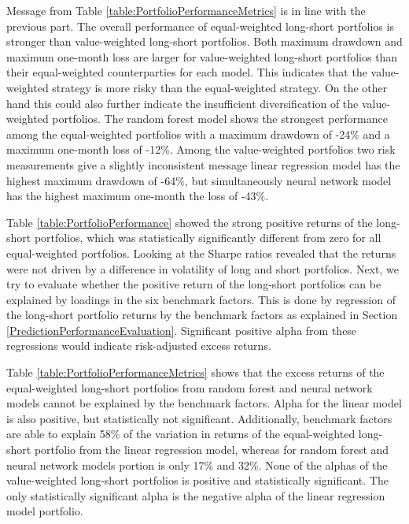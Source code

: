 \documentclass[12pt]{article}
\begin{document}
Message from Table \ref{table:PortfolioPerformanceMetrics} is in line with the previous part. The overall performance of equal-weighted long-short portfolios is stronger than value-weighted long-short portfolios. Both maximum drawdown and maximum one-month loss are larger for value-weighted long-short portfolios than their equal-weighted counterparties for each model. This indicates that the value-weighted strategy is more risky than the equal-weighted strategy. On the other hand this could also further indicate the insufficient diversification of the value-weighted portfolios. The random forest model shows the strongest performance among the equal-weighted portfolios with a maximum drawdown of -24\% and a maximum one-month loss of -12\%. Among the value-weighted portfolios two risk measurements give a slightly inconsistent message linear regression model has the highest maximum drawdown of -64\%, but simultaneously neural network model has the highest maximum one-month the loss of -43\%. \par

Table \ref{table:PortfolioPerformance} showed the strong positive returns of the long-short portfolios, which was statistically significantly different from zero for all equal-weighted portfolios. Looking at the Sharpe ratios revealed that the returns were not driven by a difference in volatility of long and short portfolios. Next, we try to evaluate whether the positive return of the long-short portfolios can be explained by loadings in the six benchmark factors. This is done by regression of the long-short portfolio returns by the benchmark factors as explained in Section \ref{PredictionPerformanceEvaluation}. Significant positive alpha from these regressions would indicate risk-adjusted excess returns. \par

Table \ref{table:PortfolioPerformanceMetrics} shows that the excess returns of the equal-weighted long-short portfolios from random forest and neural network models cannot be explained by the benchmark factors. Alpha for the linear model is also positive, but statistically not significant. Additionally, benchmark factors are able to explain 58\% of the variation in returns of the equal-weighted long-short portfolio from the linear regression model, whereas for random forest and neural network models portion is only 17\% and 32\%. None of the alphas of the value-weighted long-short portfolios is positive and statistically significant. The only statistically significant alpha is the negative alpha of the linear regression model portfolio. \par
\end{document}
